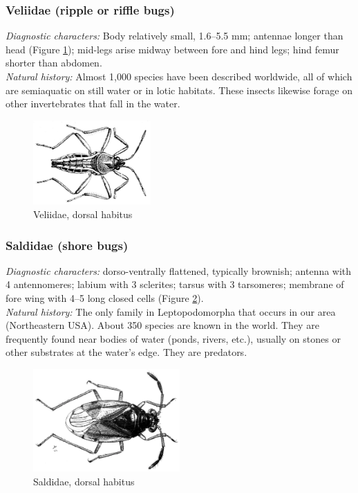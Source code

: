 \documentclass[letterpaper, 11pt]{article}
\begin{document}
\subsubsection{Veliidae (ripple or riffle bugs)}
\noindent{}\textit{Diagnostic characters:} Body relatively small, 1.6--5.5 mm; antennae longer than head (Figure \ref{fig:veliid1}); mid-legs arise midway between fore and hind legs; hind femur shorter than abdomen.\\

\noindent{}\textit{Natural history:} Almost 1,000 species have been described worldwide, all of which are semiaquatic on still water or in lotic habitats. These insects likewise forage on other invertebrates that fall in the water.\\

\begin{figure}[ht!]
 \centering
 \includegraphics[width=0.4\textwidth]{VeliidHabitus}
 \caption{Veliidae, dorsal habitus \citep[][Plate 7, Fig. 11]{bhl37902}}
 \label{fig:veliid1}
\end{figure}

\subsubsection{Saldidae (shore bugs)}
\noindent{}\textit{Diagnostic characters:} dorso-ventrally flattened, typically brownish; antenna with 4 antennomeres; labium with 3 sclerites; tarsus with 3 tarsomeres; membrane of fore wing with 4--5 long closed cells (Figure \ref{fig:saldids}).\\

\noindent{}\textit{Natural history:} The only family in Leptopodomorpha that occurs in our area (Northeastern USA). About 350 species are known in the world. They are frequently found near bodies of water (ponds, rivers, etc.), usually on stones or other substrates at the water's edge. They are predators.\\

\begin{figure}[ht!]
 \centering
 \includegraphics[width=0.5\textwidth]{saldidae.png}
 \caption{Saldidae, dorsal habitus \citep[][Fig. 7:40b]{bhlitem126080aquatic}}
 \label{fig:saldids}
\end{figure}
\end{document}
